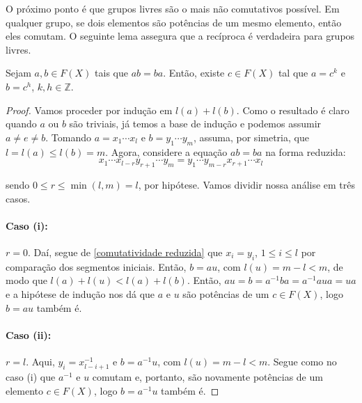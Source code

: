     	\par\vspace{0.3cm} O próximo ponto é que grupos livres são o mais não comutativos possível. 
    	Em qualquer grupo, se dois elementos são potências de um mesmo elemento, então eles comutam. 
    	O seguinte lema assegura que a recíproca é verdadeira para grupos livres.
    	\begin{lemma}
    	\label{comutatividade em grupos livres}
    		Sejam $a,b\in F(X)$ tais que $ab=ba$. Então, existe $c\in F(X)$ tal que $a = c^k$ e 
    		$b = c^h$, $k, h\in\mathbb{Z}$.
    	\end{lemma}
    	\begin{proof}
    		Vamos proceder por indução em $l(a) + l(b)$. Como o resultado é claro quando $a$ ou $b$ 
    		são triviais, já temos a base de indução e podemos assumir $a\neq e\neq b$. Tomando 
    		$a = x_1\cdots x_l$ e $b = y_1\cdots y_m$, assuma, por simetria, que $l = l(a) \leq l(b) = m$. 
    		Agora, considere a equação $ab=ba$ na forma reduzida:
    		\begin{equation}
    		\label{comutatividade reduzida}
    		    x_1\cdots x_{l-r}y_{r+1}\cdots y_m = y_1\cdots y_{m-r}x_{r+1}\cdots x_l
    		\end{equation}
    		\par\vspace{0.3cm} sendo $0\leq r\leq\min(l,m) = l$, por hipótese. Vamos dividir nossa análise 
    		em três casos.
    		
    		\paragraph{Caso (i):} $r=0$. Daí, segue de \eqref{comutatividade reduzida} que 
    		$x_i=y_i$, $1\leq i\leq l$ por comparação dos segmentos iniciais. Então, $b = au$, com 
    		$l(u) = m-l<m$, de modo que $l(a) + l(u)< l(a) + l(b)$. Então, $au = b = a^{-1}ba = a^{-1}aua = ua$ 
    		e a hipótese de indução nos dá que $a$ e $u$ são potências de um $c\in F(X)$, logo $b=au$ também é.
    		
    		\paragraph{Caso (ii):} $r = l$. Aqui, $y_i = x_{l-i+1}^{-1}$ e $b = a^{-1}u$, com $l(u) = m-l<m$.
    		Segue como no caso (i) que $a^{-1}$ e $u$ comutam e, portanto, são novamente potências de um 
    		elemento $c\in F(X)$, logo $b = a^{-1}u$ também é.
    		

\end{proof}
